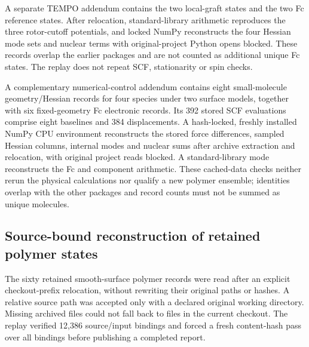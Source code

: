 \documentclass[11pt]{article}
\begin{document}
A separate TEMPO addendum contains the two local-graft states and the two Fc reference states. After relocation, standard-library arithmetic reproduces the three rotor-cutoff potentials, and locked NumPy reconstructs the four Hessian mode sets and nuclear terms with original-project Python opens blocked. These records overlap the earlier packages and are not counted as additional unique Fc states. The replay does not repeat SCF, stationarity or spin checks.

A complementary numerical-control addendum contains eight small-molecule geometry/Hessian records for four species under two surface models, together with six fixed-geometry Fc electronic records. Its 392 stored SCF evaluations comprise eight baselines and 384 displacements. A hash-locked, freshly installed NumPy CPU environment reconstructs the stored force differences, sampled Hessian columns, internal modes and nuclear sums after archive extraction and relocation, with original project reads blocked. A standard-library mode reconstructs the Fc and component arithmetic. These cached-data checks neither rerun the physical calculations nor qualify a new polymer ensemble; identities overlap with the other packages and record counts must not be summed as unique molecules.

\subsection{Source-bound reconstruction of retained polymer states}
The sixty retained smooth-surface polymer records were read after an explicit checkout-prefix relocation, without rewriting their original paths or hashes. A relative source path was accepted only with a declared original working directory. Missing archived files could not fall back to files in the current checkout. The replay verified 12,386 source/input bindings and forced a fresh content-hash pass over all bindings before publishing a completed report.
\end{document}
